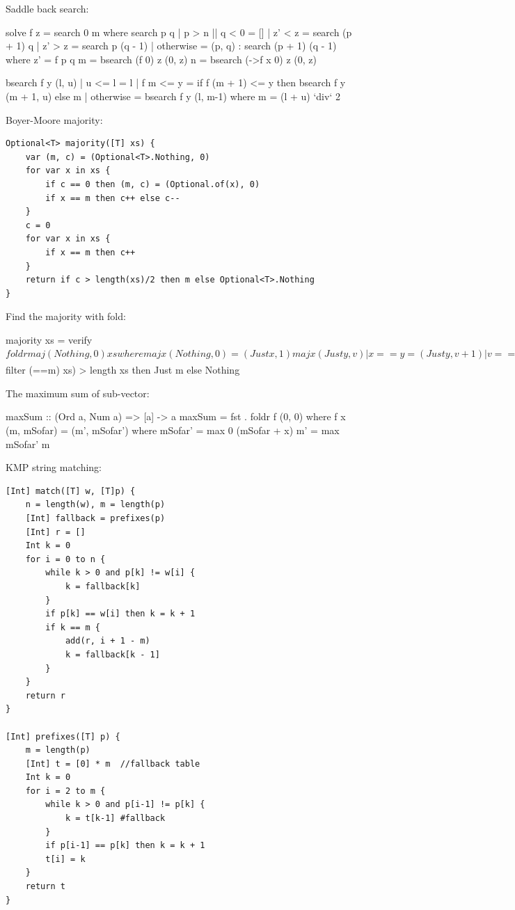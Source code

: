 \documentclass[b5paper]{article}
\begin{document}
Saddle back search:

\begin{Haskell}
solve f z = search 0 m where
  search p q | p > n || q < 0 = []
             | z' < z = search (p + 1) q
             | z' > z = search p (q - 1)
             | otherwise = (p, q) : search (p + 1) (q - 1)
    where z' = f p q
  m = bsearch (f 0) z (0, z)
  n = bsearch (\x->f x 0) z (0, z)

bsearch f y (l, u) | u <= l = l
                   | f m <= y = if f (m + 1) <= y then bsearch f y (m + 1, u) else m
                   | otherwise = bsearch f y (l, m-1)
  where m = (l + u) `div` 2
\end{Haskell}

Boyer-Moore majority:

\begin{lstlisting}[language = Bourbaki]
Optional<T> majority([T] xs) {
    var (m, c) = (Optional<T>.Nothing, 0)
    for var x in xs {
        if c == 0 then (m, c) = (Optional.of(x), 0)
        if x == m then c++ else c--
    }
    c = 0
    for var x in xs {
        if x == m then c++
    }
    return if c > length(xs)/2 then m else Optional<T>.Nothing
}
\end{lstlisting}

Find the majority with fold:

\begin{Haskell}
majority xs = verify $ foldr maj (Nothing, 0) xs where
  maj x (Nothing, 0) = (Just x, 1)
  maj x (Just y, v) | x == y = (Just y, v + 1)
                    | v == 0 = (Just x, 1)
                    | otherwise = (Just y, v - 1)
  verify (Nothing, _) = Nothing
  verify (Just m, _)  = if 2 * (length $ filter (==m) xs) > length xs
                        then Just m else Nothing
\end{Haskell} %

The maximum sum of sub-vector:

\begin{Haskell}
maxSum :: (Ord a, Num a) => [a] -> a
maxSum = fst . foldr f (0, 0) where
  f x (m, mSofar) = (m', mSofar') where
    mSofar' = max 0 (mSofar + x)
    m' = max mSofar' m
\end{Haskell}

KMP string matching:

\begin{lstlisting}[language = Bourbaki]
[Int] match([T] w, [T]p) {
    n = length(w), m = length(p)
    [Int] fallback = prefixes(p)
    [Int] r = []
    Int k = 0
    for i = 0 to n {
        while k > 0 and p[k] != w[i] {
            k = fallback[k]
        }
        if p[k] == w[i] then k = k + 1
        if k == m {
            add(r, i + 1 - m)
            k = fallback[k - 1]
        }
    }
    return r
}

[Int] prefixes([T] p) {
    m = length(p)
    [Int] t = [0] * m  //fallback table
    Int k = 0
    for i = 2 to m {
        while k > 0 and p[i-1] != p[k] {
            k = t[k-1] #fallback
        }
        if p[i-1] == p[k] then k = k + 1
        t[i] = k
    }
    return t
}
\end{lstlisting}
\end{document}

